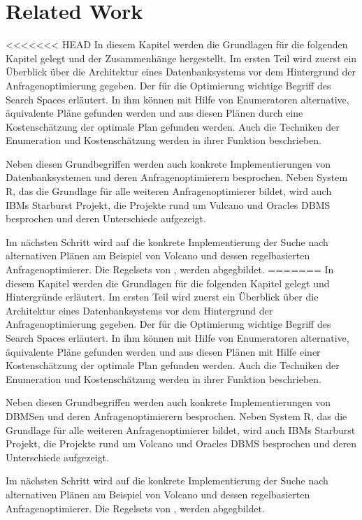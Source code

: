 \chapter{Related Work}


<<<<<<< HEAD
In diesem Kapitel werden die Grundlagen für die folgenden Kapitel gelegt und der Zusammenhänge hergestellt. Im ersten Teil wird zuerst ein Überblick über die Architektur eines Datenbanksystems vor dem Hintergrund der Anfragenoptimierung gegeben. Der für die Optimierung wichtige Begriff des Search Spaces erläutert. In ihm können mit Hilfe von Enumeratoren alternative, äquivalente Pläne gefunden werden und aus diesen Plänen durch eine Kostenschätzung der optimale Plan gefunden werden. Auch die Techniken der Enumeration und Kostenschätzung werden in ihrer Funktion beschrieben.

Neben diesen Grundbegriffen werden auch konkrete Implementierungen von Datenbanksystemen und deren Anfragenoptimierern besprochen. Neben System R, das die Grundlage für alle weiteren Anfragenoptimierer bildet, wird auch IBMs Starburst Projekt, die Projekte rund um Vulcano und Oracles DBMS besprochen und deren Unterschiede aufgezeigt.

Im nächsten Schritt wird auf die konkrete Implementierung der Suche nach alternativen Plänen am Beispiel von Volcano und dessen regelbasierten Anfragenoptimierer. Die Regelsets von \cite{pellenkoft1997complexity}, \cite{pellenkoft1997duplicate} werden abgegbildet.
=======
In diesem Kapitel werden die Grundlagen für die folgenden Kapitel gelegt und Hintergründe erläutert. Im ersten Teil wird zuerst ein Überblick über die Architektur eines Datenbanksystems vor dem Hintergrund der Anfragenoptimierung gegeben. Der für die Optimierung wichtige Begriff des Search Spaces erläutert. In ihm können mit Hilfe von Enumeratoren alternative, äquivalente Pläne gefunden werden und aus diesen Plänen mit Hilfe einer Kostenschätzung der optimale Plan gefunden werden. Auch die Techniken der Enumeration und Kostenschätzung werden in ihrer Funktion beschrieben.

Neben diesen Grundbegriffen werden auch konkrete Implementierungen von DBMSen und deren Anfragenoptimierern besprochen. Neben System R, das die Grundlage für alle weiteren Anfragenoptimierer bildet, wird auch IBMs Starburst Projekt, die Projekte rund um Volcano und Oracles DBMS besprochen und deren Unterschiede aufgezeigt.

Im nächsten Schritt wird auf die konkrete Implementierung der Suche nach alternativen Plänen am Beispiel von Volcano und dessen regelbasierten Anfragenoptimierer. Die Regelsets von \cite{pellenkoft1997complexity}, \cite{pellenkoft1997duplicate} werden abgegbildet.

